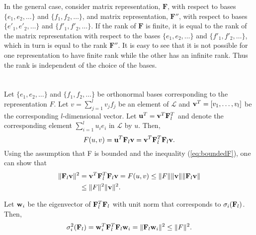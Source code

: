 \documentclass[12pt,onecolumn,draftcls]{IEEEtran}
\begin{document}
In the general case, consider matrix representation, $\mathbf{F}$, with respect to bases
$\{e_1, e_2, \ldots \}$ and $\{f_1, f_2, \ldots \}$, and  matrix representation, $\mathbf{F}''$, with respect to bases
$\{e'_1, e'_2, \ldots \}$ and $\{f'_1, f'_2, \ldots \}$.  If the rank of $\mathbf{F}$ is finite, it is equal to the rank of the
matrix representation with respect to the bases $\{e_1, e_2, \ldots \}$  and $\{f'_1, f'_2, \ldots \}$, which in turn
is equal to the rank $\mathbf{F}''$.  It is easy to see that it is not possible for one representation to have finite
rank while the other has an infinite rank.  Thus the rank is independent of the choice of the bases.

\setcounter{section}{1}
\section{}\setcounter{equation}{0}
\setcounter{section}{9}

Let $\{e_1, e_2, \ldots \}$ and $\{f_1, f_2, \ldots \}$ be orthonormal bases corresponding to the representation $F$.
Let  $v=\sum_{j=1}^l v_j f_j$ be an element of $\mathcal{L}$ and
${\bf v}^T = [v_1, \ldots , v_l]$ be the corresponding $l$-dimensional vector.
Let ${\bf u}^T = {\bf v}^T {\bf F}_l^T$
and denote the corresponding element $\sum_{i=1}^l u_i e_i$
in $\mathcal{L}$ by $u$.  Then,
\begin{equation}
F(u,v) = {\bf u}^T {\bf F}_l {\bf v} = {\bf v}^T {\bf F}_l^T {\bf F}_l {\bf v}.
\end{equation}
Using the assumption that F is bounded and the inequality (\ref{eq:boundedF}), one can
show that
\begin{align}
\| {\bf F}_l {\bf v} \|^2 &= {\bf v}^T {\bf F}_l^T {\bf F}_l {\bf v}  = F(u,v)
\leq \|F\|  \|{\bf v}\| \|{\bf F}_l {\bf v}\|\\
&\leq \|F\|^2 \|{\bf v}\|^2.
\end{align}

Let  ${\bf w}_i$ be the eigenvector of ${\bf F}_l^T {\bf F}_l$ with unit norm
that corresponds to $\sigma_i({\bf F}_l)$.  Then,
\begin{equation}
\sigma_i^2({\bf F}_l) =  {\bf w}_i^T {\bf F}_l^T {\bf F}_l {\bf w}_i  = \| {\bf F}_l {\bf w}_i \|^2
\leq  \| F \|^2.
\end{equation}
\vspace{-0.5in}
\end{document}
